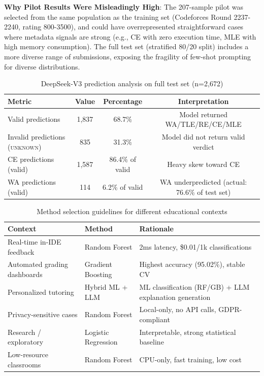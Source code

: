 \documentclass[10pt,letterpaper]{article}
\begin{document}
\textbf{Why Pilot Results Were Misleadingly High}: The 207-sample pilot was selected from the same population as the training set (Codeforces Round 2237-2240, rating 800-3500), and could have overrepresented straightforward cases where metadata signals are strong (e.g., CE with zero execution time, MLE with high memory consumption). The full test set (stratified 80/20 split) includes a more diverse range of submissions, exposing the fragility of few-shot prompting for diverse distributions.

\begin{table}[htbp]
\centering
\caption{DeepSeek-V3 prediction analysis on full test set (n=2,672)}
\label{tab:deepseek-analysis}
\begin{tabular}{@{}lccc@{}}
\toprule
\textbf{Metric} & \textbf{Value} & \textbf{Percentage} & \textbf{Interpretation} \\
\midrule
Valid predictions          & 1,837 & 68.7\% & Model returned WA/TLE/RE/CE/MLE \\
Invalid predictions (\textsc{unknown}) & 835   & 31.3\% & Model did not return valid verdict \\
\midrule
CE predictions (valid)    & 1,587 & 86.4\% of valid & Heavy skew toward CE \\
WA predictions (valid)    & 114   & 6.2\% of valid  & WA underpredicted (actual: 76.6\% of test set) \\
\bottomrule
\end{tabular}
\end{table}


\begin{table}[htbp]
\centering
\caption{Method selection guidelines for different educational contexts}
\label{tab:guidelines}
\begin{tabular}{>{\raggedright\arraybackslash}p{2.8cm}>{\raggedright\arraybackslash}p{2.8cm}>{\raggedright\arraybackslash}p{6.4cm}}
\toprule
\textbf{Context} & \textbf{Method} & \textbf{Rationale} \\
\midrule
Real-time in-IDE feedback & Random Forest & 2ms latency, \$0.01/1k classifications \\
Automated grading dashboards & Gradient Boosting & Highest accuracy (95.02\%), stable CV \\
Personalized tutoring & Hybrid ML + LLM & ML classification (RF/GB) + LLM explanation generation \\
Privacy-sensitive cases & Random Forest & Local-only, no API calls, GDPR-compliant \\
Research / exploratory & Logistic Regression & Interpretable, strong statistical baseline \\
Low-resource classrooms & Random Forest & CPU-only, fast training, low cost \\
\bottomrule
\end{tabular}
\end{table}
\end{document}
